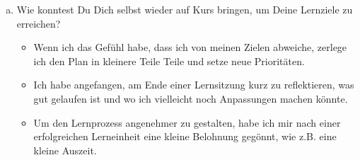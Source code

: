 \documentclass[10pt, oneside]{article}
\begin{document}
\begin{enumerate}[(a)]
    \item Wie konntest Du Dich selbst wieder auf Kurs bringen, um Deine
        Lernziele zu erreichen?

        \begin{itemize}
            \item Wenn ich das Gefühl habe, dass ich von meinen Zielen
                abweiche, zerlege ich den Plan in kleinere Teile Teile und
                setze neue Prioritäten.
            \item Ich habe angefangen, am Ende einer Lernsitzung kurz zu
                reflektieren, was gut gelaufen ist und wo ich vielleicht noch
                Anpassungen machen könnte.
            \item Um den Lernprozess angenehmer zu gestalten, habe ich mir nach
                einer erfolgreichen Lerneinheit eine kleine Belohnung gegönnt,
                wie z.B. eine kleine Auszeit.
        \end{itemize}

\end{enumerate}
\end{document}
